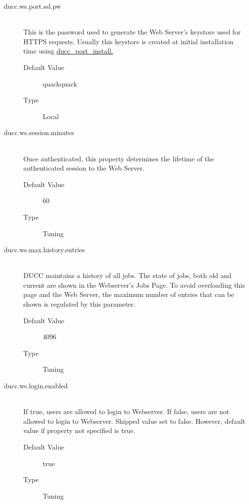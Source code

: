 \begin{description}
        \item[ducc.ws.port.ssl.pw] \hfill \\
          This is the password used to generate the Web Server's keystore used for HTTPS requests.  Usually
          this keystore is created at initial installation time using \hyperref[subsec:install.single-user]{ducc\_post\_install.}
          \begin{description}
            \item[Default Value] quackquack 
            \item[Type] Local
          \end{description}
                    
        \item[ducc.ws.session.minutes] \hfill \\
          Once authenticated, this property determines the lifetime of the authenticated session to the 
          Web Server. 
          \begin{description}
            \item[Default Value] 60 
            \item[Type] Tuning
          \end{description}

        \item[ducc.ws.max.history.entries] \hfill \\
          DUCC maintains a history of all jobs.  The state of jobs, both old and current are shown
          in the Webserver's Jobs Page.  To avoid overloading this page and the Web Server, the maximum
          number of entries that can be shown is regulated by this parameter.
          \begin{description}
            \item[Default Value] 4096
            \item[Type] Tuning
          \end{description}

        \item[ducc.ws.login.enabled] \hfill \\
          If true, users are allowed to login to Webserver.  If false, users are
          not allowed to login to Webserver.  Shipped value set to false. 
          However, default value if property not specified is true.
          \begin{description}
            \item[Default Value] true
            \item[Type] Tuning
          \end{description}


\end{description}
